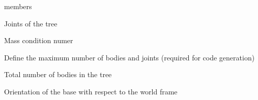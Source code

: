 \documentclass[letterpaper,10pt,english]{sphinxmanual}
\begin{document}
\begin{fulllineitems}
\begin{sphinxuseclass}{members}
\begin{description}
\begin{fulllineitems}
\end{fulllineitems}


\begin{fulllineitems}
\label{\detokenize{bodytree:BodyTree.Joints}}
\pysigstartsignatures
{}
\pysigstopsignatures
\sphinxAtStartPar
Joints of the tree

\end{fulllineitems}


\begin{fulllineitems}
\label{\detokenize{bodytree:BodyTree.MassConditionNumber}}
\pysigstartsignatures
{}
\pysigstopsignatures
\sphinxAtStartPar
Mass condition numer

\end{fulllineitems}


\begin{fulllineitems}
\label{\detokenize{bodytree:BodyTree.MaxBodiesNumber}}
\pysigstartsignatures
{}
\pysigstopsignatures
\sphinxAtStartPar
Define the maximum number of bodies and joints (required for code generation)

\end{fulllineitems}


\begin{fulllineitems}
\label{\detokenize{bodytree:BodyTree.N_B}}
\pysigstartsignatures
{}
\pysigstopsignatures
\sphinxAtStartPar
Total number of bodies in the tree

\end{fulllineitems}


\begin{fulllineitems}
\label{\detokenize{bodytree:BodyTree.T0}}
\pysigstartsignatures
{}
\pysigstopsignatures
\sphinxAtStartPar
Orientation of the base with respect to the world frame


\end{fulllineitems}
\end{description}
\end{sphinxuseclass}
\end{fulllineitems}
\end{document}
